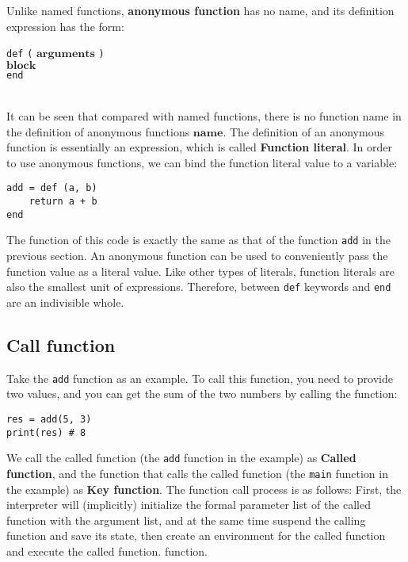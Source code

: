 Unlike named functions, \textbf{anonymous function} has no name, and its definition expression has the form:
\begin{algorithm}
    \texttt{def} \texttt{(} $\bm{arguments}$ \texttt{)} \\
        \qquad $\bm{block}$ \\
    \texttt{end}
\end{algorithm}\vspace{-0.6em}\\
It can be seen that compared with named functions, there is no function name in the definition of anonymous functions $\bm{name}$. The definition of an anonymous function is essentially an expression, which is called \textbf{Function literal}. In order to use anonymous functions, we can bind the function literal value to a variable:
\begin{lstlisting}[language=berry, numbers=none]
add = def (a, b)
    return a + b
end
\end{lstlisting}
The function of this code is exactly the same as that of the function \texttt{add} in the previous section. An anonymous function can be used to conveniently pass the function value as a literal value. Like other types of literals, function literals are also the smallest unit of expressions. Therefore, between \texttt{def} keywords and \texttt{end} are an indivisible whole.

\subsection {Call function}

Take the \texttt{add} function as an example. To call this function, you need to provide two values, and you can get the sum of the two numbers by calling the function:
\begin{lstlisting}[language=berry, numbers=none]
res = add(5, 3)
print(res) # 8
\end{lstlisting}
We call the called function (the \texttt{add} function in the example) as \textbf{Called function}, and the function that calls the called function (the \texttt{main} function in the example) as \textbf{Key function}. The function call process is as follows: First, the interpreter will (implicitly) initialize the formal parameter list of the called function with the argument list, and at the same time suspend the calling function and save its state, then create an environment for the called function and execute the called function. function.

